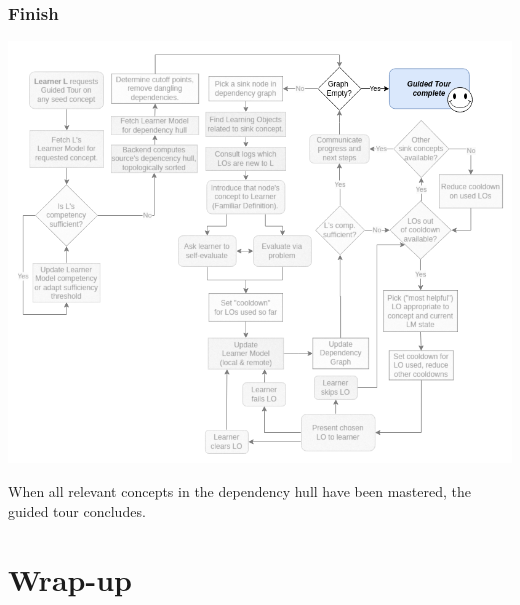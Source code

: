 \documentclass[aspectratio=169, usenames, dvipsnames]{beamer}
\begin{document}
\begin{frame}
\frametitle{Finish}
\begin{minipage}{0.7\textwidth}
\vspace*{-10px}
\includegraphics[height=0.9\textheight,keepaspectratio]{images/gt_algorithm_square_step4}
\end{minipage}%
\begin{minipage}{0.3\textwidth}
When all relevant concepts in the dependency hull have been mastered, the guided tour concludes.
\end{minipage}%
\end{frame}

\section{Wrap-up}
\end{document}

